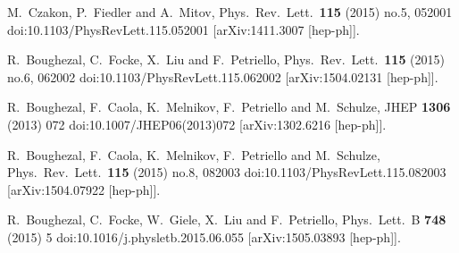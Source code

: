 
  M.~Czakon, P.~Fiedler and A.~Mitov,
  Phys.\ Rev.\ Lett.\  {\bf 115} (2015) no.5,  052001
  doi:10.1103/PhysRevLett.115.052001
  [arXiv:1411.3007 [hep-ph]].

  R.~Boughezal, C.~Focke, X.~Liu and F.~Petriello,
  Phys.\ Rev.\ Lett.\  {\bf 115} (2015) no.6,  062002
  doi:10.1103/PhysRevLett.115.062002
  [arXiv:1504.02131 [hep-ph]].



  R.~Boughezal, F.~Caola, K.~Melnikov, F.~Petriello and M.~Schulze,
  JHEP {\bf 1306} (2013) 072
  doi:10.1007/JHEP06(2013)072
  [arXiv:1302.6216 [hep-ph]].

  R.~Boughezal, F.~Caola, K.~Melnikov, F.~Petriello and M.~Schulze,
  Phys.\ Rev.\ Lett.\  {\bf 115} (2015) no.8,  082003
  doi:10.1103/PhysRevLett.115.082003
  [arXiv:1504.07922 [hep-ph]].


  R.~Boughezal, C.~Focke, W.~Giele, X.~Liu and F.~Petriello,
  Phys.\ Lett.\ B {\bf 748} (2015) 5
  doi:10.1016/j.physletb.2015.06.055
  [arXiv:1505.03893 [hep-ph]].

